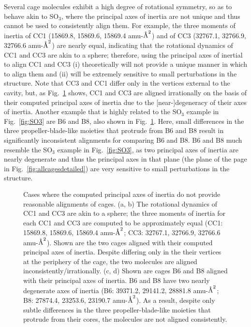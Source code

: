 \documentclass[journal=jacsat,manuscript=article]{achemso}
\newcommand{\angstrom}{\mbox{\normalfont\AA}}
\begin{document}
{Several cage molecules exhibit a high degree of rotational symmetry, so as to behave akin to SO$_3$, where the principal axes of inertia are not unique and thus cannot be used to consistently align them. For example, the three moments of inertia of CC1 (15869.8, 15869.6, 15869.4 amu-$\angstrom^2$) and of CC3 (32767.1, 32766.9, 32766.6 amu-$\angstrom^2$) are nearly equal, indicating that the rotational dynamics of CC1 and CC3 are akin to a sphere; therefore, using the principal axes of inertial to align CC1 and CC3 (i) theoretically will not provide a unique manner in which to align them and (ii) will be extremely sensitive to small perturbations in the structure. Note that CC3 and CC1 differ only in the vertices external to the cavity, but, as Fig.~\ref{fig:misaligned} shows, CC1 and CC3 are aligned irrationally on the basis of their computed principal axes of inertia due to the [near-]degeneracy of their axes of inertia. Another example that is highly related to the SO$_3$ example in Fig.~\ref{fig:SO3} are B6 and B8, also shown in Fig.~\ref{fig:misaligned}. Here, small differences in the three propeller-blade-like moieties that protrude from B6 and B8 result in significantly inconsistent alignments for comparing B6 and B8. B6 and B8 much resemble the SO$_3$ example in Fig.~\ref{fig:SO3}, as two principal axes of inertia are nearly degenerate and thus the principal axes in that plane (the plane of the page in Fig.~\ref{fig:allcagesdetailed}) are very sensitive to small perturbations in the structure.

\begin{figure}
\centering
	 \qquad
	\caption{{\color{red} Cases where the computed principal axes of inertia do not provide reasonable alignments of cages. (a, b) The rotational dynamics of CC1 and CC3 are akin to a sphere; the three moments of inertia for each CC1 and CC3 are computed to be approximately equal (CC1: 15869.8, 15869.6, 15869.4 amu-$\angstrom^2$; CC3: 32767.1, 32766.9, 32766.6 amu-$\angstrom^2$). Shown are the two cages aligned with their computed principal axes of inertia. Despite differing only in the their vertices at the periphery of the cage, the two molecules are aligned inconsistently/irrationally. (c, d) Shown are cages B6 and B8 aligned with their principal axes of inertia. B6 and B8 have two nearly degenerate axes of inertia (B6: 39371.2, 29141.2, 28881.8 amu-$\angstrom^2$; B8: 27874.4, 23253.6, 23190.7 amu-$\angstrom^2$). As a result, despite only subtle differences in the three propeller-blade-like moieties that protrude from their cores, the molecules are not aligned consistently.
	}%
	} \label{fig:misaligned}
\end{figure}

}
\end{document}
